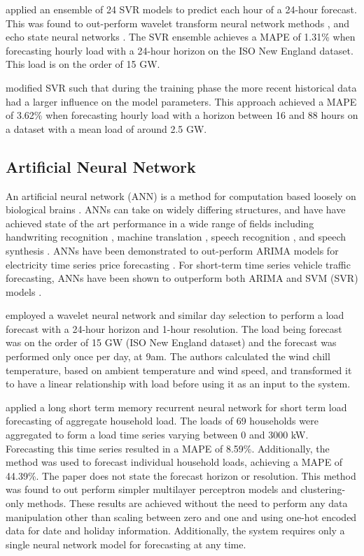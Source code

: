 \citet{Ceperic2013} applied an ensemble of 24 SVR models to predict each hour of a 24-hour forecast.
This was found to out-perform wavelet transform neural network methods \cite{RochaReis2005}\cite{AMJADY2009}, and echo state neural networks \cite{Deihimi2012}.
The SVR ensemble achieves a MAPE of 1.31\% when forecasting hourly load with a 24-hour horizon on the ISO New England dataset.
This load is on the order of 15 GW.

\citet{Elattar2010} modified SVR such that during the training phase the more recent historical data had a larger influence on the model parameters.
This approach achieved a MAPE of 3.62\% when forecasting hourly load with a horizon between 16 and 88 hours on a dataset with a mean load of around 2.5 GW.


\subsection{Artificial Neural Network}
\label{litrev-ann}
An artificial neural network (ANN) is a method for computation based loosely on biological brains \citep{negnevitsky2005artificial}.
ANNs can take on widely differing structures, and have have achieved state of the art performance in a wide range of fields including handwriting recognition \citep{2017arXiv171009829S}, machine translation \citep{Vaswani2017}, speech recognition \citep{Chiu2017}, and speech synthesis \citep{DBLP:journals/corr/OordDZSVGKSK16}.
ANNs have been demonstrated to out-perform ARIMA models for electricity time series price forecasting \citep{Mandal2010}.
For short-term time series vehicle traffic forecasting, ANNs have been shown to outperform both ARIMA and SVM (SVR) models \cite{Zhao2017}.

\citet{Chen2010} employed a wavelet neural network and similar day selection to perform a load forecast with a 24-hour horizon and 1-hour resolution.
The load being forecast was on the order of 15 GW (ISO New England dataset) and the forecast was performed only once per day, at 9am.
The authors calculated the wind chill temperature, based on ambient temperature and wind speed, and transformed it to have a linear relationship with load before using it as an input to the system.

\citet{Kong2017}\cite{Kong2018} applied a long short term memory recurrent neural network for short term load forecasting of aggregate household load.
The loads of 69 households were aggregated to form a load time series varying between 0 and 3000 kW.
Forecasting this time series resulted in a MAPE of 8.59\%.
Additionally, the method was used to forecast individual household loads, achieving a MAPE of 44.39\%.
The paper does not state the forecast horizon or resolution.
This method was found to out perform simpler multilayer perceptron models and clustering-only methods.
These results are achieved without the need to perform any data manipulation other than scaling between zero and one and using one-hot encoded data for date and holiday information.
Additionally, the system requires only a single neural network model for forecasting at any time.

